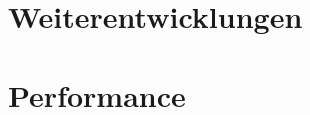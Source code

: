 

\section{Weiterentwicklungen}\label{sec:weiterentwicklungen}


\section{Performance}\label{sec:performance}